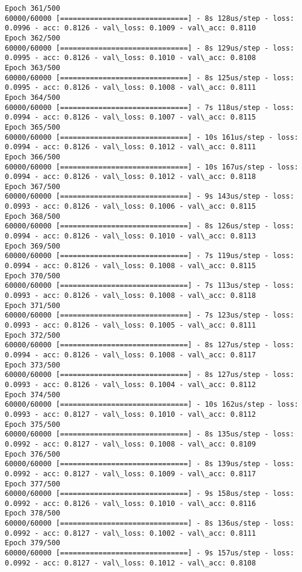 \documentclass[11pt]{article}
\begin{document}
\begin{Verbatim}[commandchars=\\\{\}]
Epoch 361/500
60000/60000 [==============================] - 8s 128us/step - loss: 0.0996 - acc: 0.8126 - val\_loss: 0.1009 - val\_acc: 0.8110
Epoch 362/500
60000/60000 [==============================] - 8s 129us/step - loss: 0.0995 - acc: 0.8126 - val\_loss: 0.1010 - val\_acc: 0.8108
Epoch 363/500
60000/60000 [==============================] - 8s 125us/step - loss: 0.0995 - acc: 0.8126 - val\_loss: 0.1008 - val\_acc: 0.8111
Epoch 364/500
60000/60000 [==============================] - 7s 118us/step - loss: 0.0994 - acc: 0.8126 - val\_loss: 0.1007 - val\_acc: 0.8115
Epoch 365/500
60000/60000 [==============================] - 10s 161us/step - loss: 0.0994 - acc: 0.8126 - val\_loss: 0.1012 - val\_acc: 0.8111
Epoch 366/500
60000/60000 [==============================] - 10s 167us/step - loss: 0.0994 - acc: 0.8126 - val\_loss: 0.1012 - val\_acc: 0.8118
Epoch 367/500
60000/60000 [==============================] - 9s 143us/step - loss: 0.0993 - acc: 0.8126 - val\_loss: 0.1006 - val\_acc: 0.8115
Epoch 368/500
60000/60000 [==============================] - 8s 126us/step - loss: 0.0994 - acc: 0.8126 - val\_loss: 0.1010 - val\_acc: 0.8113
Epoch 369/500
60000/60000 [==============================] - 7s 119us/step - loss: 0.0994 - acc: 0.8126 - val\_loss: 0.1008 - val\_acc: 0.8115
Epoch 370/500
60000/60000 [==============================] - 7s 113us/step - loss: 0.0993 - acc: 0.8126 - val\_loss: 0.1008 - val\_acc: 0.8118
Epoch 371/500
60000/60000 [==============================] - 7s 123us/step - loss: 0.0993 - acc: 0.8126 - val\_loss: 0.1005 - val\_acc: 0.8111
Epoch 372/500
60000/60000 [==============================] - 8s 127us/step - loss: 0.0994 - acc: 0.8126 - val\_loss: 0.1008 - val\_acc: 0.8117
Epoch 373/500
60000/60000 [==============================] - 8s 127us/step - loss: 0.0993 - acc: 0.8126 - val\_loss: 0.1004 - val\_acc: 0.8112
Epoch 374/500
60000/60000 [==============================] - 10s 162us/step - loss: 0.0993 - acc: 0.8127 - val\_loss: 0.1010 - val\_acc: 0.8112
Epoch 375/500
60000/60000 [==============================] - 8s 135us/step - loss: 0.0992 - acc: 0.8127 - val\_loss: 0.1008 - val\_acc: 0.8109
Epoch 376/500
60000/60000 [==============================] - 8s 139us/step - loss: 0.0992 - acc: 0.8127 - val\_loss: 0.1009 - val\_acc: 0.8117
Epoch 377/500
60000/60000 [==============================] - 9s 158us/step - loss: 0.0992 - acc: 0.8126 - val\_loss: 0.1010 - val\_acc: 0.8116
Epoch 378/500
60000/60000 [==============================] - 8s 136us/step - loss: 0.0992 - acc: 0.8127 - val\_loss: 0.1002 - val\_acc: 0.8111
Epoch 379/500
60000/60000 [==============================] - 9s 157us/step - loss: 0.0992 - acc: 0.8127 - val\_loss: 0.1012 - val\_acc: 0.8108

\end{Verbatim}
\end{document}
